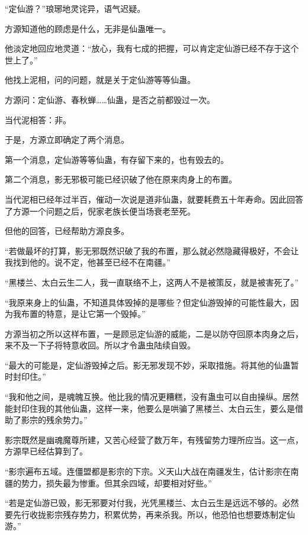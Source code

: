 
\begin{this_body}



“定仙游？”琅琊地灵诧异，语气迟疑。

方源知道他的顾虑是什么，无非是仙蛊唯一。

他淡定地回应地灵道：“放心，我有七成的把握，可以肯定定仙游已经不存于这个世上了。”

他找上泥相，问的问题，就是关于定仙游等等仙蛊。

方源问：定仙游、春秋蝉……仙蛊，是否之前都毁过一次。

当代泥相答：非。

于是，方源立即确定了两个消息。

第一个消息，定仙游等等仙蛊，有存留下来的，也有毁去的。

第二个消息，影无邪极可能已经识破了他在原来肉身上的布置。

当代泥相已经年过半百，催动一次说是道非仙蛊，就要耗费五十年寿命。因此回答了方源一个问题之后，倪家老族长便当场衰老至死。

但他的回答，已经帮助方源良多。

“若做最坏的打算，影无邪既然识破了我的布置，那么就必然隐藏得极好，不会让我找到他的。说不定，他甚至已经不在南疆。”

“黑楼兰、太白云生二人，我一直联络不上，这两人不是被策反，就是被害死了。”

“我原来身上的仙蛊，不知道具体毁掉的是哪些？但定仙游毁掉的可能性最大，因为我布置的特意，是让它第一个毁掉。”

方源当初之所以这样布置，一是顾忌定仙游的威能，二是以防夺回原本肉身之后，来不及一下子将特意收回。所以才令蛊虫陆续自毁。

“最大的可能是，定仙游毁掉之后。影无邪发现不妙，采取措施。将其他的仙蛊暂时封印住。”

“我和他之间，是魂魄互换。他比我的情况更糟糕，没有蛊虫可以自由操纵。居然能封印住我的其他仙蛊，这样一来，他要么是哄骗了黑楼兰、太白云生，要么是借助了影宗的残余势力。”

影宗既然是幽魂魔尊所建，又苦心经营了数万年，有残留势力理所应当。这一点，方源早已经估算到了。

“影宗遍布五域。连僵盟都是影宗的下宗。义天山大战在南疆发生，估计影宗在南疆的势力，损失最为惨重。但其余四域，却要相对好些。”

“若是定仙游已毁，影无邪要对付我，光凭黑楼兰、太白云生是远远不够的。必然要先行收拢影宗残存势力，积累优势，再来杀我。所以，他恐怕也想要炼制定仙游。”


\end{this_body}
